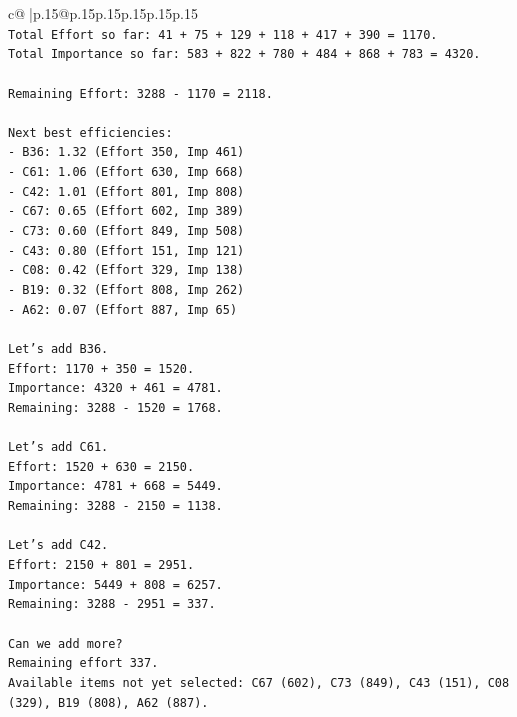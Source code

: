 \documentclass{article}
\begin{document}
{\begin{supertabular}{c@{$\;$}|p{.15\linewidth}@{}p{.15\linewidth}p{.15\linewidth}p{.15\linewidth}p{.15\linewidth}p{.15\linewidth}}
{{{\\ 
\texttt{Total Effort so far: 41 + 75 + 129 + 118 + 417 + 390 = 1170.} \\
\texttt{Total Importance so far: 583 + 822 + 780 + 484 + 868 + 783 = 4320.} \\
\\ 
\texttt{Remaining Effort: 3288 {-} 1170 = 2118.} \\
\\ 
\texttt{Next best efficiencies:} \\
\texttt{{-} B36: 1.32 (Effort 350, Imp 461)} \\
\texttt{{-} C61: 1.06 (Effort 630, Imp 668)} \\
\texttt{{-} C42: 1.01 (Effort 801, Imp 808)} \\
\texttt{{-} C67: 0.65 (Effort 602, Imp 389)} \\
\texttt{{-} C73: 0.60 (Effort 849, Imp 508)} \\
\texttt{{-} C43: 0.80 (Effort 151, Imp 121)} \\
\texttt{{-} C08: 0.42 (Effort 329, Imp 138)} \\
\texttt{{-} B19: 0.32 (Effort 808, Imp 262)} \\
\texttt{{-} A62: 0.07 (Effort 887, Imp 65)} \\
\\ 
\texttt{Let's add B36.} \\
\texttt{Effort: 1170 + 350 = 1520.} \\
\texttt{Importance: 4320 + 461 = 4781.} \\
\texttt{Remaining: 3288 {-} 1520 = 1768.} \\
\\ 
\texttt{Let's add C61.} \\
\texttt{Effort: 1520 + 630 = 2150.} \\
\texttt{Importance: 4781 + 668 = 5449.} \\
\texttt{Remaining: 3288 {-} 2150 = 1138.} \\
\\ 
\texttt{Let's add C42.} \\
\texttt{Effort: 2150 + 801 = 2951.} \\
\texttt{Importance: 5449 + 808 = 6257.} \\
\texttt{Remaining: 3288 {-} 2951 = 337.} \\
\\ 
\texttt{Can we add more?} \\
\texttt{Remaining effort 337.} \\
\texttt{Available items not yet selected: C67 (602), C73 (849), C43 (151), C08 (329), B19 (808), A62 (887).} \\
}}}
\end{supertabular}}
\end{document}
